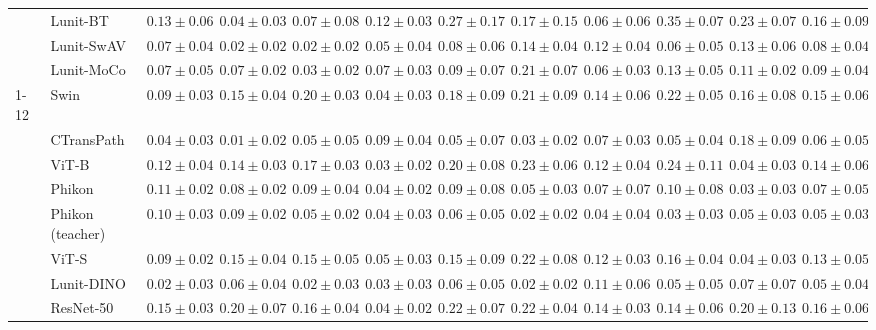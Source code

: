 \begin{tabular}{ll|cccc|c|cccc|c}
 & Lunit-BT & $0.13 \pm 0.06$ & $0.04 \pm 0.03$ & $0.07 \pm 0.08$ & $0.12 \pm 0.03$ & $0.27 \pm 0.17$ & $0.17 \pm 0.15$ & $0.06 \pm 0.06$ & $0.35 \pm 0.07$ & $0.23 \pm 0.07$ & $0.16 \pm 0.09$ \\
 & Lunit-SwAV & $0.07 \pm 0.04$ & $\mathbf{0.02 \pm 0.02}$ & $\mathbf{0.02 \pm 0.02}$ & $0.05 \pm 0.04$ & $0.08 \pm 0.06$ & $0.14 \pm 0.04$ & $0.12 \pm 0.04$ & $0.06 \pm 0.05$ & $0.13 \pm 0.06$ & $0.08 \pm 0.04$ \\
 & Lunit-MoCo & $0.07 \pm 0.05$ & $0.07 \pm 0.02$ & $0.03 \pm 0.02$ & $0.07 \pm 0.03$ & $0.09 \pm 0.07$ & $0.21 \pm 0.07$ & $0.06 \pm 0.03$ & $0.13 \pm 0.05$ & $0.11 \pm 0.02$ & $0.09 \pm 0.04$ \\
\cline{1-12}
\multirow[t]{12}{*}{Transformer} & Swin & $0.09 \pm 0.03$ & $0.15 \pm 0.04$ & $0.20 \pm 0.03$ & $0.04 \pm 0.03$ & $0.18 \pm 0.09$ & $0.21 \pm 0.09$ & $0.14 \pm 0.06$ & $0.22 \pm 0.05$ & $0.16 \pm 0.08$ & $0.15 \pm 0.06$ \\
 & CTransPath & $0.04 \pm 0.03$ & $\mathbf{0.01 \pm 0.02}$ & $0.05 \pm 0.05$ & $0.09 \pm 0.04$ & $\mathbf{0.05 \pm 0.07}$ & $0.03 \pm 0.02$ & $0.07 \pm 0.03$ & $0.05 \pm 0.04$ & $0.18 \pm 0.09$ & $0.06 \pm 0.05$ \\
 & ViT-B & $0.12 \pm 0.04$ & $0.14 \pm 0.03$ & $0.17 \pm 0.03$ & $0.03 \pm 0.02$ & $0.20 \pm 0.08$ & $0.23 \pm 0.06$ & $0.12 \pm 0.04$ & $0.24 \pm 0.11$ & $0.04 \pm 0.03$ & $0.14 \pm 0.06$ \\
 & Phikon & $0.11 \pm 0.02$ & $0.08 \pm 0.02$ & $0.09 \pm 0.04$ & $0.04 \pm 0.02$ & $0.09 \pm 0.08$ & $0.05 \pm 0.03$ & $0.07 \pm 0.07$ & $0.10 \pm 0.08$ & $\mathbf{0.03 \pm 0.03}$ & $0.07 \pm 0.05$ \\
 & Phikon (teacher) & $0.10 \pm 0.03$ & $0.09 \pm 0.02$ & $0.05 \pm 0.02$ & $0.04 \pm 0.03$ & $0.06 \pm 0.05$ & $0.02 \pm 0.02$ & $0.04 \pm 0.04$ & $\mathbf{0.03 \pm 0.03}$ & $0.05 \pm 0.03$ & $0.05 \pm 0.03$ \\
 & ViT-S & $0.09 \pm 0.02$ & $0.15 \pm 0.04$ & $0.15 \pm 0.05$ & $0.05 \pm 0.03$ & $0.15 \pm 0.09$ & $0.22 \pm 0.08$ & $0.12 \pm 0.03$ & $0.16 \pm 0.04$ & $0.04 \pm 0.03$ & $0.13 \pm 0.05$ \\
 & Lunit-DINO & $\mathbf{0.02 \pm 0.03}$ & $0.06 \pm 0.04$ & $\mathbf{0.02 \pm 0.03}$ & $\mathbf{0.03 \pm 0.03}$ & $0.06 \pm 0.05$ & $\mathbf{0.02 \pm 0.02}$ & $0.11 \pm 0.06$ & $0.05 \pm 0.05$ & $0.07 \pm 0.07$ & $\mathbf{0.05 \pm 0.04}$ \\
 & ResNet-50 & $0.15 \pm 0.03$ & $0.20 \pm 0.07$ & $0.16 \pm 0.04$ & $0.04 \pm 0.02$ & $0.22 \pm 0.07$ & $0.22 \pm 0.04$ & $0.14 \pm 0.03$ & $0.14 \pm 0.06$ & $0.20 \pm 0.13$ & $0.16 \pm 0.06$ \\

\end{tabular}
